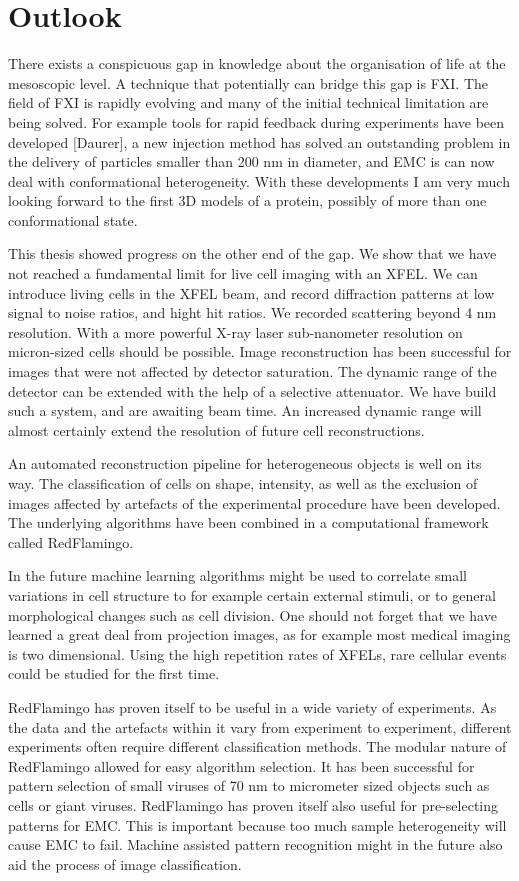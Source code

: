 \chapter{Outlook}
There exists a conspicuous gap in knowledge about the organisation of life at the mesoscopic level. A technique that potentially can bridge this gap is FXI. The field of FXI is rapidly evolving and many of the initial technical limitation are being solved. For example tools for rapid feedback during experiments have been developed [Daurer], a new injection method has solved an outstanding problem in the delivery of particles smaller than 200 nm in diameter, and EMC is can now deal with conformational heterogeneity. With these developments I am very much looking forward to the first 3D models of a protein, possibly of more than one conformational state. 

This thesis showed progress on the other end of the gap. We show that we have not reached a fundamental limit for live cell imaging with an XFEL. We can introduce living cells in the XFEL beam, and record diffraction patterns at low signal to noise ratios, and hight hit ratios. We recorded scattering beyond 4 nm resolution. With a more powerful X-ray laser sub-nanometer resolution on micron-sized cells should be possible. Image reconstruction has been successful for images that were not affected by detector saturation. The dynamic range of the detector can be extended with the help of a selective attenuator. We have build such a system, and are awaiting beam time. An increased dynamic range will almost certainly extend the resolution of future cell reconstructions. 

An automated reconstruction pipeline for heterogeneous objects is well on its way. The classification of cells on shape, intensity, as well as the exclusion of images affected by artefacts of the experimental procedure have been developed. The underlying algorithms have been combined in a computational framework called RedFlamingo.

In the future machine learning algorithms might be used to correlate small variations in cell structure to for example certain external stimuli, or to general morphological changes such as cell division. One should not forget that we have learned a great deal from projection images, as for example most medical imaging is two dimensional. Using the high repetition rates of XFELs, rare cellular events could be studied for the first time.

RedFlamingo has proven itself to be useful in a wide variety of experiments. As the data and the artefacts within it vary from experiment to experiment, different experiments often require different classification methods. The modular nature of RedFlamingo allowed for easy algorithm selection. It has been successful for pattern selection of small viruses of 70 nm to micrometer sized objects such as cells or giant viruses. RedFlamingo has proven itself also useful for pre-selecting patterns for EMC. This is important because too much sample heterogeneity will cause EMC to fail. Machine assisted pattern recognition might in the future also aid the process of image classification. 

